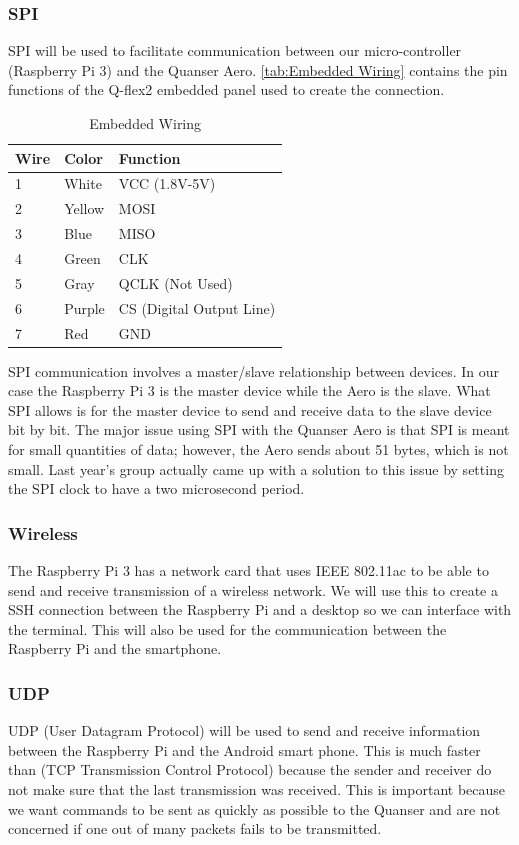 \documentclass[letterpaper, 10pt, conference]{ieeeconf}
\begin{document}
\subsubsection{SPI}
SPI will be used to facilitate communication between our micro-controller (Raspberry Pi 3) and the Quanser Aero.  \autoref{tab:Embedded Wiring} contains the pin functions of the Q-flex2 embedded panel used to create the connection. \cite{quanserAeroUserManual}
\begin{table}
    \centering
    \begin{tabular}{l|l|l}
        \toprule
        \textbf{Wire} & \textbf{Color} & \textbf{Function}\\
        \toprule
        1 & White & VCC (1.8V-5V)\\
        2 & Yellow & MOSI\\
        3 & Blue & MISO\\
        4 & Green & CLK\\
        5 & Gray & QCLK (Not Used)\\
        6 & Purple & CS (Digital Output Line)\\
        7 & Red & GND\\
        \bottomrule
    \end{tabular}
    \caption{Embedded Wiring}
    \label{tab:Embedded Wiring}
\end{table}
SPI communication involves a master/slave relationship between devices.  In our case the Raspberry Pi 3 is the master device while the Aero is the slave.  What SPI allows is for the master device to send and receive data to the slave device bit by bit.  The major issue using SPI with the Quanser Aero is that SPI is meant for small quantities of data; however, the Aero sends about 51 bytes, which is not small.  Last year's group actually came up with a solution to this issue by setting the SPI clock to have a two microsecond period.


\subsubsection{Wireless}
The Raspberry Pi 3 has a network card that uses IEEE 802.11ac to be able to send and receive transmission of a wireless network.  We will use this to create a SSH connection between the Raspberry Pi and a desktop so we can interface with the terminal.  This will also be used for the communication between the Raspberry Pi and the smartphone.

\subsubsection{UDP}
UDP (User Datagram Protocol) will be used to send and receive information between the Raspberry Pi and the Android smart phone.  This is much faster than (TCP Transmission Control Protocol) because the sender and receiver do not make sure that the last transmission was received.  This is important because we want commands to be sent as quickly as possible to the Quanser and are not concerned if one out of many packets fails to be transmitted.
\end{document}
